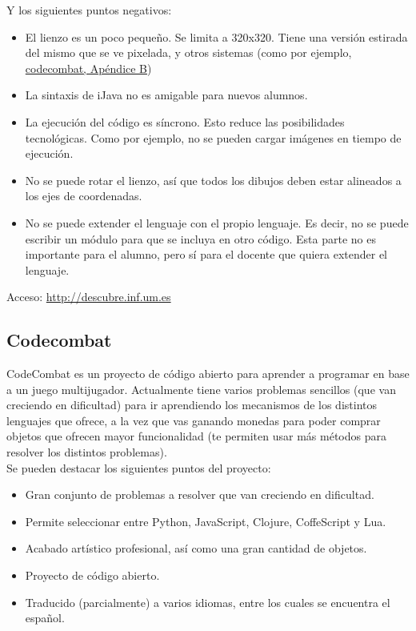 \documentclass{report}
\begin{document}
	Y los siguientes puntos negativos:
	
	\begin{itemize}
		\item El lienzo es un poco pequeño. Se limita a 320x320. Tiene una versión estirada del mismo que se ve pixelada, y otros sistemas (como por ejemplo, \hyperref[app:b]{codecombat, Apéndice B})
		\item La sintaxis de iJava no es amigable para nuevos alumnos.
		\item La ejecución del código es síncrono. Esto reduce las posibilidades tecnológicas. Como por ejemplo, no se pueden cargar imágenes en tiempo de ejecución.
		\item No se puede rotar el lienzo, así que todos los dibujos deben estar alineados a los ejes de coordenadas.
		\item No se puede extender el lenguaje con el propio lenguaje. Es decir, no se puede escribir un módulo para que se incluya en otro código. Esta parte no es importante para el alumno, pero sí para el docente que quiera extender el lenguaje.
	\end{itemize}
	
	\hfill
	
	Acceso: \url{http://descubre.inf.um.es}
	
	\subsection{Codecombat}
	
	CodeCombat es un proyecto de código abierto para aprender a programar en base a un juego multijugador. Actualmente tiene varios problemas sencillos (que van creciendo en dificultad) para ir aprendiendo los mecanismos de los distintos lenguajes que ofrece, a la vez que vas ganando monedas para poder comprar objetos que ofrecen mayor funcionalidad (te permiten usar más métodos para resolver los distintos problemas).
	\\
	
	Se pueden destacar los siguientes puntos del proyecto:
	
	\begin{itemize}
		\item Gran conjunto de problemas a resolver que van creciendo en dificultad.
		\item Permite seleccionar entre Python, JavaScript, Clojure, CoffeScript y Lua.
		\item Acabado artístico profesional, así como una gran cantidad de objetos.
		\item Proyecto de código abierto.
		\item Traducido (parcialmente) a varios idiomas, entre los cuales se encuentra el español.
	\end{itemize}
	
\end{document}
